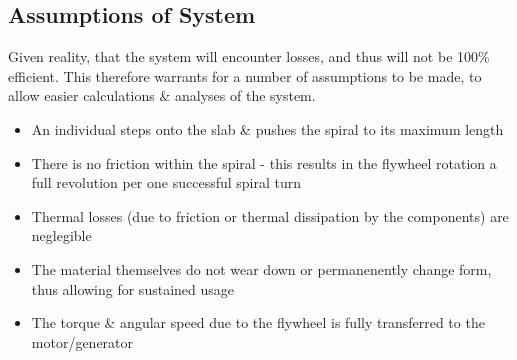 \documentclass[conference]{IEEEtran}
\begin{document}


\subsection{Assumptions of System}
Given reality, that the system will encounter losses, and thus will not be 100\% efficient. This therefore warrants for a number of assumptions to be made, to allow easier calculations \& analyses of the system.
\begin{itemize}
    \item An individual steps onto the slab \& pushes the spiral to its maximum length
    \item There is no friction within the spiral - this results in the flywheel rotation a full revolution per one successful spiral turn
    \item Thermal losses (due to friction or thermal dissipation by the components) are neglegible
    \item The material themselves do not wear down or permanenently change form, thus allowing for sustained usage
    \item The torque \& angular speed due to the flywheel is fully transferred to the motor/generator
\end{itemize}
\end{document}
